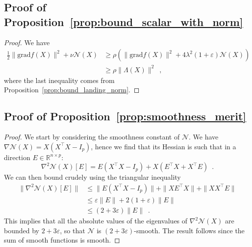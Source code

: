 \documentclass[twoside,11pt]{article}
\newcommand{\grad}{{\mathrm{grad}}}
\begin{document}
%
%
%
%
%

%
%
%
%


%
%
%
%
%
%

%
%
%
%
%
%
%

%
%
%
%
%
%
%
%

\subsection{Proof of Proposition~\ref{prop:bound_scalar_with_norm}}
\begin{proof}
    We have
    \begin{align}
         \frac12\|\grad f(X)\|^2 + \nu \mathcal{N}(X)&\geq \rho(\|\grad f(X)\|^2 + 4\lambda^2 (1+\varepsilon) \mathcal{N}(X))\\
         &\geq \rho \|\Lambda(X)\|^2\enspace,
    \end{align}
where the last inequality comes from Proposition~\ref{prop:bound_landing_norm}.
\end{proof}



\subsection{Proof of Proposition~\ref{prop:smoothness_merit}}
\begin{proof}
    We start by considering the smoothness constant of $\mathcal{N}$. We have $\nabla \mathcal{N}(X) = X(X^{\top}X-I_p)$, hence we find that its Hessian is such that in a direction $E\in\mathbb{R}^{n \times p}$:
    $$
    \nabla^2\mathcal{N}(X)[E] = E(X^{\top}X - I_p) +X(E^{\top}X + X^{\top}E)\enspace.
    $$
    We can then bound crudely using the triangular inequality
    \begin{align}
        \|\nabla^2\mathcal{N}(X)[E]\| &\leq \|E(X^{\top}X - I_p)\| +\|XE^{\top}X\| + \|XX^{\top}E\|\\
        &\leq \varepsilon\|E\| + 2(1+\varepsilon)\|E\|\\
        &\leq (2 + 3\varepsilon)\|E\|\enspace.
    \end{align}
    This implies that all the absolute values of the eigenvalues of $\nabla^2\mathcal{N}(X)$ are bounded by $2+3\varepsilon$, so that $\mathcal{N}$ is $(2+3\varepsilon)$-smooth.
    The result follows since the sum of smooth functions is smooth.
\end{proof}
\end{document}

